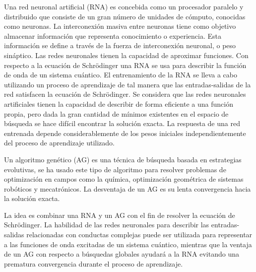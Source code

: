 Una red neuronal artificial (RNA) es concebida como un procesador paralelo y distribuido que consiste de un gran n\'umero de unidades de c\'omputo, conocidas como neuronas. La interconexi\'on masiva entre neuronas tiene como objetivo almacenar informaci\'on que representa conocimiento o experiencia. Esta informaci\'on se define a trav\'es de la fuerza de interconexi\'on neuronal, o peso sin\'aptico. Las redes neuronales tienen la capacidad de aproximar funciones. Con respecto a la ecuaci\'on de Schr\"odinger una RNA se usa para describir la funci\'on de onda de un sistema cu\'antico. El entrenamiento de la RNA se lleva a cabo utilizando un proceso de aprendizaje de tal manera que las entradas-salidas de la red satisfacen la ecuaci\'on de Schr\"odinger. Se considera que las redes neuronales artificiales tienen la capacidad de describir de forma eficiente a una funci\'on propia, pero dada la gran cantidad de m\'inimos existentes en el espacio de b\'usqueda se hace dif\'icil encontrar la soluci\'on exacta. La respuesta de una red entrenada depende considerablemente de los pesos iniciales independientemente del proceso de aprendizaje utilizado.

Un algoritmo gen\'etico (AG) es una t\'ecnica de b\'usqueda basada en estrategias evolutivas, se ha usado este tipo de algoritmo para resolver problemas de optimizaci\'on en campos como la qu\'imica, optimizaci\'on geom\'etrica de sistemas rob\'oticos y mecatr\'onicos. La desventaja de un AG es su lenta convergencia hacia la soluci\'on exacta. 

La idea es combinar una RNA y un AG con el fin de resolver la ecuaci\'on de Schr\"odinger. La habilidad de las redes neuronales para describir las entradas-salidas relacionadas con conductas complejas puede ser utilizada para representar a las funciones de onda excitadas de un sistema cu\'antico, mientras que la ventaja de un AG con respecto a b\'usquedas globales ayudar\'a a la RNA evitando una prematura convergencia durante el proceso de aprendizaje.
